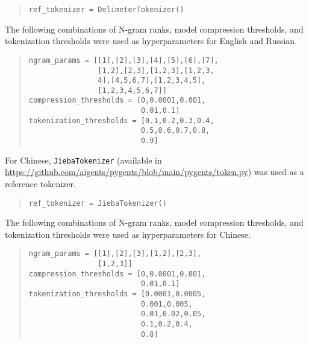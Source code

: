 \documentclass[11pt]{article}
\begin{document}
\begin{quote}\begin{small}
\begin{verbatim}
ref_tokenizer = DelimeterTokenizer()
\end{verbatim}
\end{small}\end{quote}

The following combinations of N-gram ranks, model compression thresholds, and tokenization thresholds were used as hyperparameters for English and Russian.

\begin{quote}\begin{small}
\begin{verbatim}
ngram_params = [[1],[2],[3],[4],[5],[6],[7],
                [1,2],[2,3],[1,2,3],[1,2,3,
                4],[4,5,6,7],[1,2,3,4,5],
                [1,2,3,4,5,6,7]]
compression_thresholds = [0,0.0001,0.001,
                          0.01,0.1]
tokenization_thresholds = [0.1,0.2,0.3,0.4,
                          0.5,0.6,0.7,0.8,
                          0.9] 
\end{verbatim}
\end{small}\end{quote}

For Chinese, \texttt{JiebaTokenizer} (available in \url{https://github.com/aigents/pygents/blob/main/pygents/token.py}) was used as a reference tokenizer.

\begin{quote}\begin{small}
\begin{verbatim}
ref_tokenizer = JiebaTokenizer()
\end{verbatim}
\end{small}\end{quote}

The following combinations of N-gram ranks, model compression thresholds, and tokenization thresholds were used as hyperparameters for Chinese.

\begin{quote}\begin{small}
\begin{verbatim}
ngram_params = [[1],[2],[3],[1,2],[2,3],
                [1,2,3]]
compression_thresholds = [0,0.0001,0.001,
                          0.01,0.1]
tokenization_thresholds = [0.0001,0.0005,
                          0.001,0.005,
                          0.01,0.02,0.05,
                          0.1,0.2,0.4,
                          0.8]
\end{verbatim}
\end{small}\end{quote}
\end{document}
